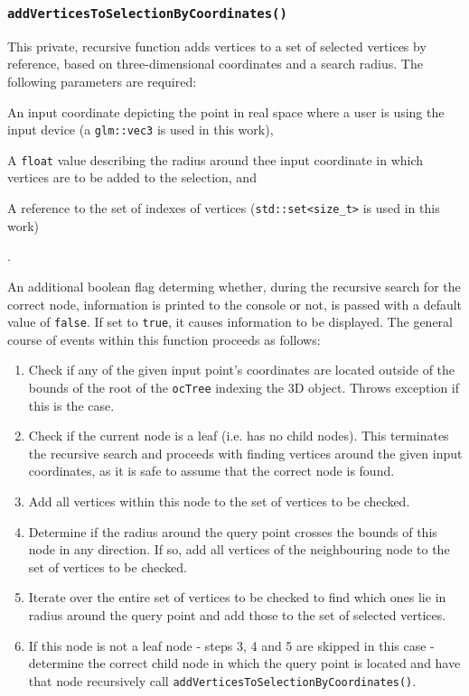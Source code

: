 	\subsubsection{\texttt{addVerticesToSelectionByCoordinates()}}
	\label{sec:addVerticesToSelectionByCoordinates()}
This private, recursive function adds vertices to a set of selected vertices by reference, based on three-dimensional coordinates and a search radius. The following parameters are required:
\begin{enumerate*}
	\item An input coordinate depicting the point in real space where a user is using the input device (a \texttt{glm::vec3} is used in this work),
	\item A \texttt{float} value describing the radius around thee input coordinate in which vertices are to be added to the selection, and
	\item A reference to the set of indexes of vertices (\texttt{std::set<size\_t>} is used in this work)
\end{enumerate*}.

An additional boolean flag determing whether, during the recursive search for the correct node, information is printed to the console or not, is passed with a default value of \texttt{false}. If set to \texttt{true}, it causes information to be displayed. The general course of events within this function proceeds as follows:
\begin{enumerate}
	\item Check if any of the given input point's coordinates are located outside of the bounds of the root of the \texttt{ocTree} indexing the 3D object. Throws exception if this is the case.
	\item Check if the current node is a leaf (i.e. has no child nodes). This terminates the recursive search and proceeds with finding vertices around the given input coordinates, as it is safe to assume that the correct node is found.
	\item Add all vertices within this node to the set of vertices to be checked.
	\item Determine if the radius around the query point crosses the bounds of this node in any direction. If so, add all vertices of the neighbouring node to the set of vertices to be checked.
	\item Iterate over the entire set of vertices to be checked to find which ones lie in radius around the query point and add those to the set of selected vertices.
	\item If this node is not a leaf node - steps 3, 4 and 5 are skipped in this case - determine the correct child node in which the query point is located and have that node recursively call \texttt{addVerticesToSelectionByCoordinates()}.
\end{enumerate}


